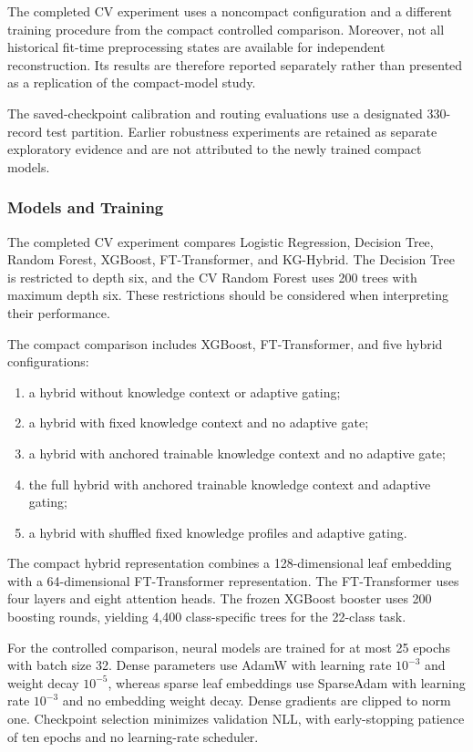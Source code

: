 The completed CV experiment uses a noncompact configuration and a
different training procedure from the compact controlled comparison.
Moreover, not all historical fit-time preprocessing states are
available for independent reconstruction. Its results are therefore
reported separately rather than presented as a replication of the
compact-model study.

The saved-checkpoint calibration and routing evaluations use a
designated 330-record test partition. Earlier robustness experiments
are retained as separate exploratory evidence and are not attributed
to the newly trained compact models.

\subsubsection{Models and Training}

The completed CV experiment compares Logistic Regression,
Decision Tree, Random Forest, XGBoost, FT-Transformer, and KG-Hybrid.
The Decision Tree is restricted to depth six, and the CV Random
Forest uses 200 trees with maximum depth six. These restrictions
should be considered when interpreting their performance.

The compact comparison includes XGBoost, FT-Transformer, and five
hybrid configurations:

\begin{enumerate}
    \item a hybrid without knowledge context or adaptive gating;
    \item a hybrid with fixed knowledge context and no adaptive gate;
    \item a hybrid with anchored trainable knowledge context and
          no adaptive gate;
    \item the full hybrid with anchored trainable knowledge context
          and adaptive gating;
    \item a hybrid with shuffled fixed knowledge profiles and
          adaptive gating.
\end{enumerate}

The compact hybrid representation combines a 128-dimensional
leaf embedding with a 64-dimensional FT-Transformer representation.
The FT-Transformer uses four layers and eight attention heads.
The frozen XGBoost booster uses 200 boosting rounds, yielding
4,400 class-specific trees for the 22-class task.

For the controlled comparison, neural models are trained for at most
25 epochs with batch size 32. Dense parameters use AdamW with learning
rate $10^{-3}$ and weight decay $10^{-5}$, whereas sparse leaf
embeddings use SparseAdam with learning rate $10^{-3}$ and no embedding
weight decay. Dense gradients are clipped to norm one.
Checkpoint selection minimizes validation NLL, with early-stopping
patience of ten epochs and no learning-rate scheduler.

